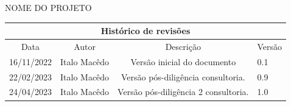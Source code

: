 \documentclass[
	12pt,				%
	openright,			%
	twoside,			%
	a4paper,			%
	english,			%
	french,				%
	spanish,			%
	brazil,				%
	]{abntex2}
\begin{document}
\begin{center}
    NOME DO PROJETO
\end{center}

\begin{historicorevisao}
\begin{table}[!h]
\centering
\begin{tabular}{|p{4cm}p{4cm}p{4cm}p{4cm}|}
\hline
\multicolumn{4}{|c|}{\textbf{Histórico de revisões}}                                                                                    \\ \hline
\multicolumn{1}{|c|}{Data}       & \multicolumn{1}{c|}{Autor}        & \multicolumn{1}{c|}{Descrição}                          & Versão \\ \hline
\multicolumn{1}{|c|}{16/11/2022} & \multicolumn{1}{c|}{Italo Macêdo} & \multicolumn{1}{c|}{Versão inicial do documento}        & 0.1    \\ \hline
\multicolumn{1}{|c|}{22/02/2023} & \multicolumn{1}{c|}{Italo Macêdo} & \multicolumn{1}{c|}{Versão pós-diligência consultoria.} & 0.9    \\ \hline
\multicolumn{1}{|c|}{24/04/2023} & \multicolumn{1}{c|}{Italo Macêdo} & \multicolumn{1}{c|}{Versão pós-diligência 2 consultoria.} & 1.0    \\ \hline
\end{tabular}
\end{table}
\end{historicorevisao}
\cleardoublepage

\listoffigures*
\cleardoublepage

\listoftables*
\cleardoublepage
\end{document}
